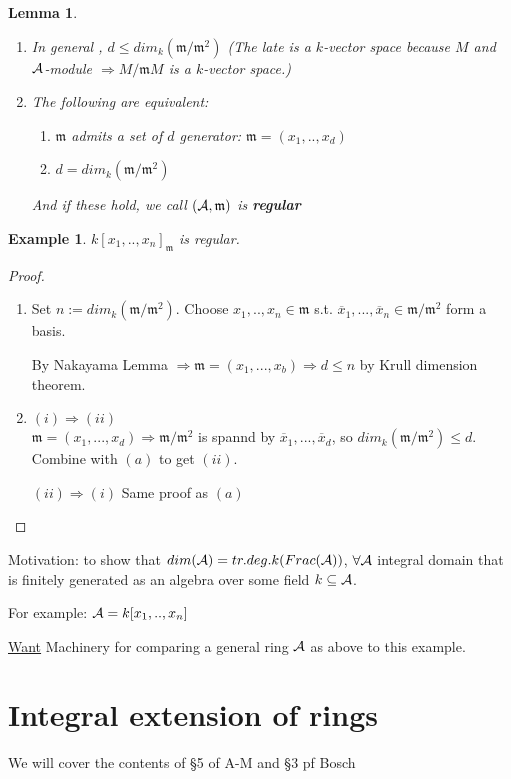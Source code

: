\documentclass[11pt]{article}
\newtheorem{lemma}[thm]{Lemma}
\newtheorem{ex}[thm]{Example}
\newcommand{\scm}{{\mathfrak m}}
\newcommand{\cala}{{\cal A}}
\newcommand{\Lrta}{\Longrightarrow}
\begin{document}
\begin{lemma}\ 
\begin{enumerate}[label=(\alph*)]
\item In general , $d\leq dim_k(\scm/\scm^2)$ (The late is a $k$-vector space because $M$ and $\cala$-module $\Lrta M/\scm M$ is a $k$-vector space.)
\item The following are equivalent:
    \begin{enumerate}[label=(\roman*)]
        \item $\scm$ admits a set of $d$ generator: $\scm=(x_1,..,x_d)$
        \item $d=dim_k(\scm/\scm^2)$
    \end{enumerate}
    And if these hold, we call $(\cala,\scm)$ is \textbf{regular}
\end{enumerate}
\end{lemma}
\begin{ex}
$k[x_1,..,x_n]_\scm$ is regular.
\end{ex}
\begin{proof}\ 
\begin{enumerate}[label=(\alph*)]
\item Set $n:=dim_k(\scm/\scm^2)$. Choose $x_1,..,x_n\in\scm$ s.t. $\overline{x}_1,...,\overline{x}_n\in \scm/\scm^2$ form a basis.

By Nakayama Lemma $\Lrta\scm=(x_1,...,x_b)\Lrta d\leq n$ by Krull dimension theorem.

\item $(i)\Lrta (ii)$\\
$\scm=(x_1,...,x_d)\Lrta \scm/\scm^2 $ is spannd by $\overline{x}_1,...,\overline{x}_d$, so $dim_k(\scm/\scm^2)\leq d$. Combine with $(a)$ to get $(ii)$.

$(ii)\Lrta (i)$ Same proof as $(a)$

\end{enumerate}
\end{proof}


Motivation: to show that $dim(\cala)=tr.deg.k(Frac(\cala))$, $\forall\cala$ integral domain that is finitely generated as an algebra over some field $k\subseteq\cala$.

For example: $\cala=k[x_1,..,x_n]$

\underline{Want} Machinery for comparing a general ring $\cala$ as above to this example.

\section{Integral extension of rings}
We will cover the contents of \S 5 of A-M and \S 3 pf Bosch
\end{document}
